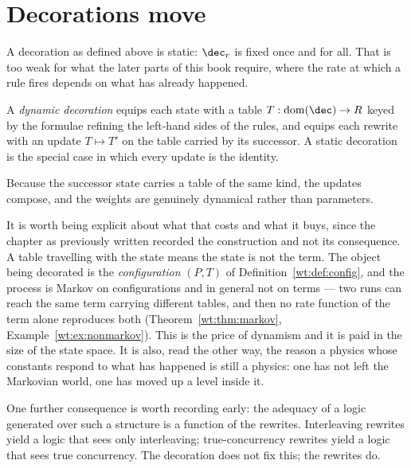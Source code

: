 \section{Decorations move}

A decoration as defined above is static: $\dec_r$ is fixed once and for
all.  That is too weak for what the later parts of this book require,
where the rate at which a rule fires depends on what has already happened.

\begin{definition}
\label{def:dyndec}
A \emph{dynamic decoration} equips each state with a table
$T : \mathrm{dom}(\dec) \to R$ keyed by the formulae refining the
left-hand sides of the rules, and equips each rewrite with an update
$T \mapsto T'$ on the table carried by its successor.  A static decoration
is the special case in which every update is the identity.
\end{definition}

Because the successor state carries a table of the same kind, the updates
compose, and the weights are genuinely dynamical rather than parameters.

It is worth being explicit about what that costs and what it buys, since
the chapter as previously written recorded the construction and not its
consequence.  A table travelling with the state means the state is not
the term.  The object being decorated is the \emph{configuration}
$(P, T)$ of Definition~\ref{wt:def:config}, and the process is Markov on
configurations and in general not on terms --- two runs can reach the same
term carrying different tables, and then no rate function of the term
alone reproduces both (Theorem~\ref{wt:thm:markov},
Example~\ref{wt:ex:nonmarkov}).  This is the price of dynamism and it is
paid in the size of the state space.  It is also, read the other way, the
reason a physics whose constants respond to what has happened is still a
physics: one has not left the Markovian world, one has moved up a level
inside it.

One further consequence is worth recording early:
the adequacy of a logic generated over such a structure is a function of
the rewrites.  Interleaving rewrites yield a logic that sees only
interleaving; true-concurrency rewrites yield a logic that sees true
concurrency.  The decoration does not fix this; the rewrites do.


